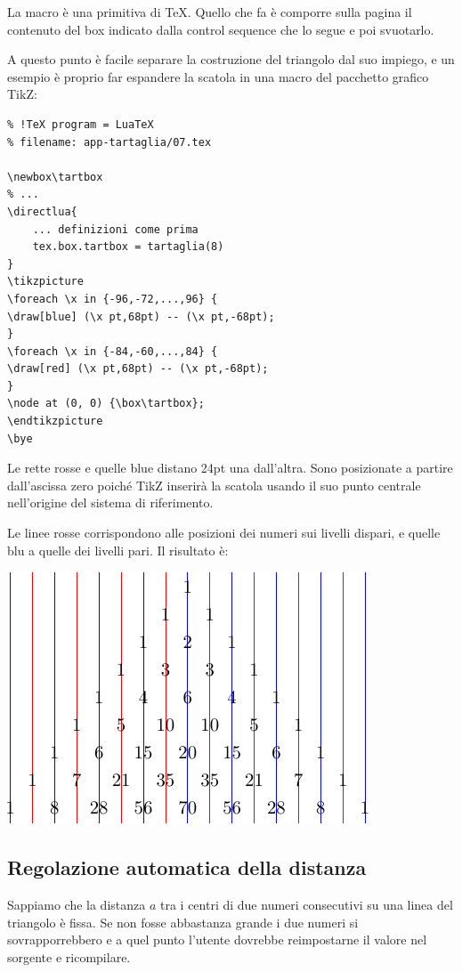 La macro  è una primitiva di \TeX{}. Quello che fa è comporre sulla
pagina il contenuto del box indicato dalla control sequence che lo segue e poi
svuotarlo.

A questo punto è facile separare la costruzione del triangolo dal suo impiego, e
un esempio è proprio far espandere la scatola in una macro  del
pacchetto grafico TikZ:
\begin{Verbatim}
% !TeX program = LuaTeX
% filename: app-tartaglia/07.tex

\newbox\tartbox
% ...
\directlua{
    ... definizioni come prima
    tex.box.tartbox = tartaglia(8)
}
\tikzpicture
\foreach \x in {-96,-72,...,96} {
\draw[blue] (\x pt,68pt) -- (\x pt,-68pt);
}
\foreach \x in {-84,-60,...,84} {
\draw[red] (\x pt,68pt) -- (\x pt,-68pt);
}
\node at (0, 0) {\box\tartbox};
\endtikzpicture
\bye
\end{Verbatim}

Le rette rosse e quelle blue distano 24pt una dall'altra. Sono posizionate a
partire dall'ascissa zero poiché TikZ inserirà la scatola usando il suo punto
centrale nell'origine del sistema di riferimento.

Le linee rosse corrispondono alle posizioni dei numeri sui livelli dispari,
e quelle blu a quelle dei livelli pari. Il risultato è:
\begin{center}
\includegraphics{image/tart-tikz.pdf}
\end{center}


\subsection{Regolazione automatica della distanza}

Sappiamo che la distanza \( a \) tra i centri di due numeri consecutivi su una
linea del triangolo è fissa. Se non fosse abbastanza grande i due numeri si
sovrapporrebbero e a quel punto l'utente dovrebbe reimpostarne il valore nel
sorgente e ricompilare.

